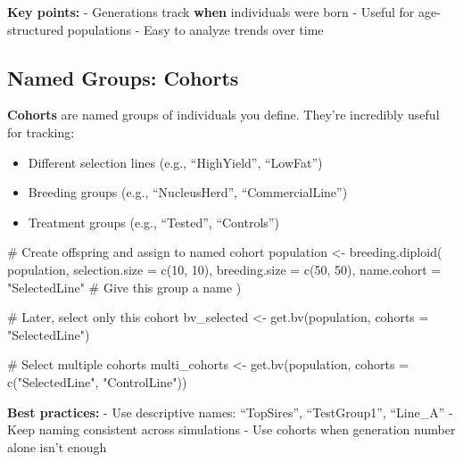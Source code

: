 \documentclass[
  letterpaper,
]{book}
\newenvironment{Shaded}{\begin{snugshade}}{\end{snugshade}}
\newcommand{\AttributeTok}[1]{\textcolor[rgb]{0.40,0.45,0.13}{#1}}
\newcommand{\CommentTok}[1]{\textcolor[rgb]{0.37,0.37,0.37}{#1}}
\newcommand{\DecValTok}[1]{\textcolor[rgb]{0.68,0.00,0.00}{#1}}
\newcommand{\FunctionTok}[1]{\textcolor[rgb]{0.28,0.35,0.67}{#1}}
\newcommand{\NormalTok}[1]{\textcolor[rgb]{0.00,0.23,0.31}{#1}}
\newcommand{\OtherTok}[1]{\textcolor[rgb]{0.00,0.23,0.31}{#1}}
\newcommand{\StringTok}[1]{\textcolor[rgb]{0.13,0.47,0.30}{#1}}
\providecommand{\tightlist}{%
  \setlength{\itemsep}{0pt}\setlength{\parskip}{0pt}}
\begin{document}
\textbf{Key points:} - Generations track \textbf{when} individuals were
born - Useful for age-structured populations - Easy to analyze trends
over time

\subsection{Named Groups: Cohorts}\label{sec-cohorts}

\textbf{Cohorts} are named groups of individuals you define. They're
incredibly useful for tracking:

\begin{itemize}
\tightlist
\item
  Different selection lines (e.g., ``HighYield'', ``LowFat'')
\item
  Breeding groups (e.g., ``NucleusHerd'', ``CommercialLine'')
\item
  Treatment groups (e.g., ``Tested'', ``Controls'')
\end{itemize}

\begin{Shaded}
\begin{Highlighting}[]
\CommentTok{\# Create offspring and assign to named cohort}
\NormalTok{population }\OtherTok{\textless{}{-}} \FunctionTok{breeding.diploid}\NormalTok{(}
\NormalTok{  population,}
  \AttributeTok{selection.size =} \FunctionTok{c}\NormalTok{(}\DecValTok{10}\NormalTok{, }\DecValTok{10}\NormalTok{),}
  \AttributeTok{breeding.size =} \FunctionTok{c}\NormalTok{(}\DecValTok{50}\NormalTok{, }\DecValTok{50}\NormalTok{),}
  \AttributeTok{name.cohort =} \StringTok{"SelectedLine"}  \CommentTok{\# Give this group a name}
\NormalTok{)}

\CommentTok{\# Later, select only this cohort}
\NormalTok{bv\_selected }\OtherTok{\textless{}{-}} \FunctionTok{get.bv}\NormalTok{(population, }\AttributeTok{cohorts =} \StringTok{"SelectedLine"}\NormalTok{)}

\CommentTok{\# Select multiple cohorts}
\NormalTok{multi\_cohorts }\OtherTok{\textless{}{-}} \FunctionTok{get.bv}\NormalTok{(population,}
                         \AttributeTok{cohorts =} \FunctionTok{c}\NormalTok{(}\StringTok{"SelectedLine"}\NormalTok{, }\StringTok{"ControlLine"}\NormalTok{))}
\end{Highlighting}
\end{Shaded}

\textbf{Best practices:} - Use descriptive names: ``TopSires'',
``TestGroup1'', ``Line\_A'' - Keep naming consistent across simulations
- Use cohorts when generation number alone isn't enough
\end{document}
